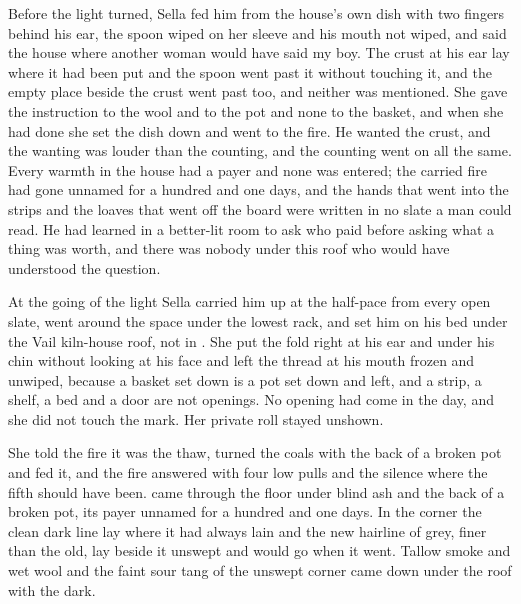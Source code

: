 Before the light turned, Sella fed him from the house's own dish with two fingers behind his ear, the spoon wiped on her sleeve and his mouth not wiped, and said the house where another woman would have said my boy. The crust at his ear lay where it had been put and the spoon went past it without touching it, and the empty place beside the crust went past too, and neither was mentioned. She gave the instruction to the wool and to the pot and none to the basket, and when she had done she set the dish down and went to the fire. He wanted the crust, and the wanting was louder than the counting, and the counting went on all the same. Every warmth in the house had a payer and none was entered; the carried fire had gone unnamed for a hundred and one days, and the hands that went into the strips and the loaves that went off the board were written in no slate a man could read. He had learned in a better-lit room to ask who paid before asking what a thing was worth, and there was nobody under this roof who would have understood the question.

\scenebreak

At the going of the light Sella carried him up at the half-pace from every open slate, went around the space under the lowest rack, and set him on his bed under the Vail kiln-house roof, not in . She put the fold right at his ear and under his chin without looking at his face and left the thread at his mouth frozen and unwiped, because a basket set down is a pot set down and left, and a strip, a shelf, a bed and a door are not openings. No opening had come in the day, and she did not touch the mark. Her private roll stayed unshown.

She told the fire it was the thaw, turned the coals with the back of a broken pot and fed it, and the fire answered with four low pulls and the silence where the fifth should have been.  came through the floor under blind ash and the back of a broken pot, its payer unnamed for a hundred and one days. In the corner the clean dark line lay where it had always lain and the new hairline of grey, finer than the old, lay beside it unswept and would go when it went. Tallow smoke and wet wool and the faint sour tang of the unswept corner came down under the roof with the dark.

